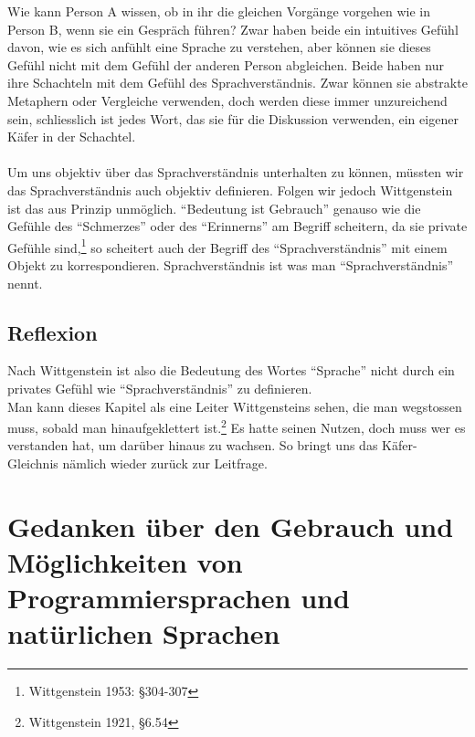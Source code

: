 \documentclass[a4paper,10pt]{article}
\begin{document}
Wie kann Person A wissen, ob in ihr die gleichen Vorgänge vorgehen wie in Person B, wenn sie ein Gespräch führen? 
Zwar haben beide ein intuitives Gefühl davon, wie es sich anfühlt eine Sprache zu verstehen, aber können sie dieses Gefühl nicht mit dem Gefühl der anderen Person abgleichen. Beide haben nur ihre Schachteln mit dem Gefühl des Sprachverständnis. Zwar können sie abstrakte Metaphern oder Vergleiche verwenden, doch werden diese immer unzureichend sein, schliesslich ist jedes Wort, das sie für die Diskussion verwenden, ein eigener Käfer in der Schachtel. \\ \\
Um uns objektiv über das Sprachverständnis unterhalten zu können, müssten wir das Sprachverständnis auch objektiv definieren. Folgen wir jedoch Wittgenstein ist das aus Prinzip unmöglich. \enquote{Bedeutung ist Gebrauch} genauso wie die Gefühle des \enquote{Schmerzes} oder des \enquote{Erinnerns} am Begriff scheitern, da sie private Gefühle sind,\footnote{Wittgenstein 1953: §304-307} so scheitert auch der Begriff des \enquote{Sprachverständnis} mit einem Objekt zu korrespondieren. Sprachverständnis ist was man \enquote{Sprachverständnis} nennt. \\


\subsection{Reflexion}
Nach Wittgenstein ist also die Bedeutung des Wortes \enquote{Sprache} nicht durch ein privates Gefühl wie \enquote{Sprachverständnis} zu definieren. \\
Man kann dieses Kapitel als eine Leiter Wittgensteins sehen, die man wegstossen muss, sobald man hinaufgeklettert ist.\footnote{Wittgenstein 1921, §6.54} Es hatte seinen Nutzen, doch muss wer es verstanden hat, um darüber hinaus zu wachsen. So bringt uns das Käfer-Gleichnis nämlich wieder zurück zur Leitfrage. \\


\section{Gedanken über den Gebrauch und Möglichkeiten von Programmiersprachen und natürlichen Sprachen}
\end{document}
